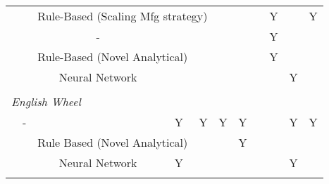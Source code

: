 \begin{tabular}{ccccccccccc}
               & \citep{Opritescu2012AutomatedStrategy,Opritescu2016VariationVariance,Hartmann2019Knowledge-basedPartitioning}   & \multicolumn{3}{l}{Rule-Based (Scaling Mfg strategy)}          &           &           &               & Y          &              & Y         \\
               & \citep{Yang2009AutomatisierungProgramming}                                                                      & -                                &                &            &           &           &               & Y          &              &           \\
               & \citep{Yang2011GeometricalProcess}                                                                              & \multicolumn{2}{l}{Rule-Based (Novel Analytical)} &            &           &           &               & Y          &              &           \\
               & \citep{Opritescu2015AutomatedApproach,Hartmann2019AnFree-forming}                                               & Neural Network                   &                &            &           &           &               &            & Y            &           \\
               &                                                                                                         &                                  &                &            &           &           &               &            &              &           \\
\multicolumn{11}{l}{\textit{English Wheel}} \\
			   & -                                                                                                       &                                  & Y              & Y          & Y         & Y         &               &            & Y            & Y         \\
               & \citep{Vazquez2017RoboticWheeling}                                                                              & \multicolumn{2}{l}{Rule Based (Novel Analytical)} &            &           & Y         &               &            &              &           \\
               & \citep{Rossi2018ModellingWheel, Rossi2018Re/LearningSurfaces}                                                   & Neural Network                   & Y              &            &           &           &               &            & Y            &           \\
               &                                                                                                         &                                  &                &            &           &           &               &            &              &           \\

\end{tabular}
